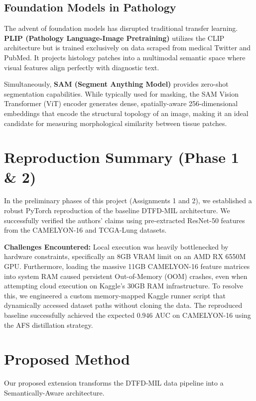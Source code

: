\documentclass[12pt, a4paper]{article}
\begin{document}
\subsection{Foundation Models in Pathology}
The advent of foundation models has disrupted traditional transfer learning. \textbf{PLIP (Pathology Language-Image Pretraining)} utilizes the CLIP architecture but is trained exclusively on data scraped from medical Twitter and PubMed. It projects histology patches into a multimodal semantic space where visual features align perfectly with diagnostic text.

Simultaneously, \textbf{SAM (Segment Anything Model)} provides zero-shot segmentation capabilities. While typically used for masking, the SAM Vision Transformer (ViT) encoder generates dense, spatially-aware 256-dimensional embeddings that encode the structural topology of an image, making it an ideal candidate for measuring morphological similarity between tissue patches.

\section{Reproduction Summary (Phase 1 \& 2)}
In the preliminary phases of this project (Assignments 1 and 2), we established a robust PyTorch reproduction of the baseline DTFD-MIL architecture. We successfully verified the authors' claims using pre-extracted ResNet-50 features from the CAMELYON-16 and TCGA-Lung datasets. 

\textbf{Challenges Encountered:} Local execution was heavily bottlenecked by hardware constraints, specifically an 8GB VRAM limit on an AMD RX 6550M GPU. Furthermore, loading the massive 11GB CAMELYON-16 feature matrices into system RAM caused persistent Out-of-Memory (OOM) crashes, even when attempting cloud execution on Kaggle's 30GB RAM infrastructure. To resolve this, we engineered a custom memory-mapped Kaggle runner script that dynamically accessed dataset paths without cloning the data. The reproduced baseline successfully achieved the expected $0.946$ AUC on CAMELYON-16 using the AFS distillation strategy.

\section{Proposed Method}
Our proposed extension transforms the DTFD-MIL data pipeline into a Semantically-Aware architecture. 
\end{document}
